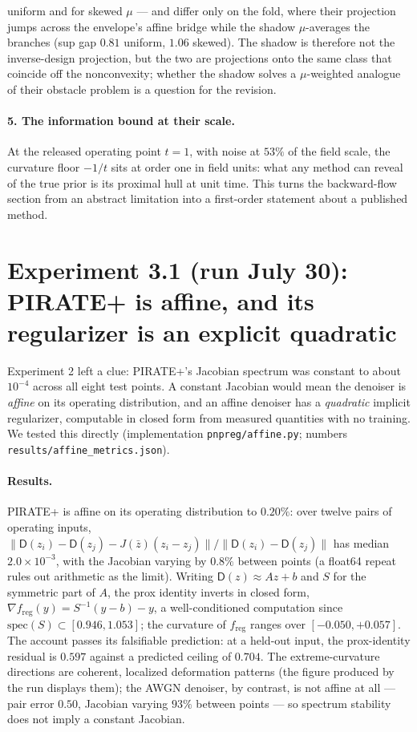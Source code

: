 \documentclass[11pt]{article}
\newcommand{\D}{\mathsf{D}}
\newcommand{\freg}{f_{\mathrm{reg}}}
\begin{document}
uniform and for skewed $\mu$ --- and differ only on the fold, where their projection jumps across the envelope's affine bridge while the shadow $\mu$-averages the branches (sup gap $0.81$ uniform, $1.06$ skewed). The shadow is therefore not the inverse-design projection, but the two are projections onto the same class that coincide off the nonconvexity; whether the shadow solves a $\mu$-weighted analogue of their obstacle problem is a question for the revision.

\paragraph{5. The information bound at their scale.} At the released operating point $t = 1$, with noise at $53\%$ of the field scale, the curvature floor $-1/t$ sits at order one in field units: what any method can reveal of the true prior is its proximal hull at unit time. This turns the backward-flow section from an abstract limitation into a first-order statement about a published method.

\section{Experiment 3.1 (run July 30): PIRATE+ is affine, and its regularizer is an explicit quadratic}
\label{sec:expaffine}

Experiment 2 left a clue: PIRATE+'s Jacobian spectrum was constant to about $10^{-4}$ across all eight test points. A constant Jacobian would mean the denoiser is \emph{affine} on its operating distribution, and an affine denoiser has a \emph{quadratic} implicit regularizer, computable in closed form from measured quantities with no training. We tested this directly (implementation \texttt{pnpreg/affine.py}; numbers \texttt{results/affine\_metrics.json}).

\paragraph{Results.} PIRATE+ is affine on its operating distribution to $0.20\%$: over twelve pairs of operating inputs, $\|\D(z_i) - \D(z_j) - J(\bar z)(z_i - z_j)\| / \|\D(z_i) - \D(z_j)\|$ has median $2.0 \times 10^{-3}$, with the Jacobian varying by $0.8\%$ between points (a float64 repeat rules out arithmetic as the limit). Writing $\D(z) \approx Az + b$ and $S$ for the symmetric part of $A$, the prox identity inverts in closed form, $\nabla\freg(y) = S^{-1}(y - b) - y$, a well-conditioned computation since $\mathrm{spec}(S) \subset [0.946, 1.053]$; the curvature of $\freg$ ranges over $[-0.050, +0.057]$. The account passes its falsifiable prediction: at a held-out input, the prox-identity residual is $0.597$ against a predicted ceiling of $0.704$. The extreme-curvature directions are coherent, localized deformation patterns (the figure produced by the run displays them); the AWGN denoiser, by contrast, is not affine at all --- pair error $0.50$, Jacobian varying $93\%$ between points --- so spectrum stability does not imply a constant Jacobian.
\end{document}
